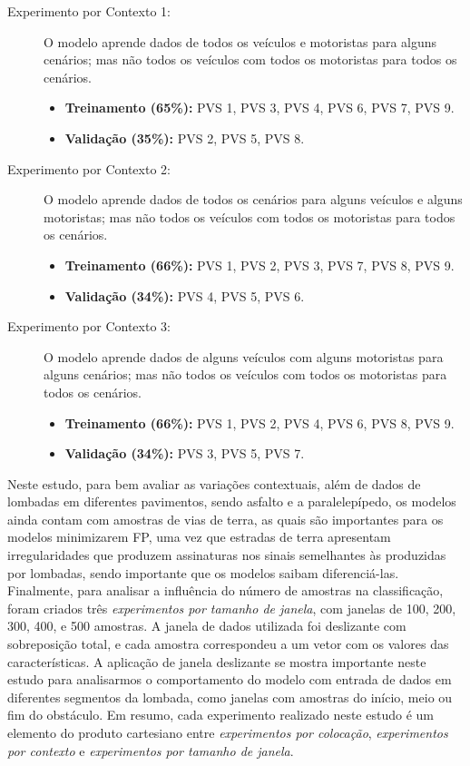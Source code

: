 \begin{description}
	
	\item[Experimento por Contexto 1:] O modelo aprende dados de todos os veículos e motoristas para alguns cenários; mas não todos os veículos com todos os motoristas para todos os cenários.
    \begin{itemize}
        \item \textbf{Treinamento (65\%):} PVS 1, PVS 3, PVS 4, PVS 6, PVS 7, PVS 9. 
        \item \textbf{Validação (35\%):} PVS 2, PVS 5, PVS 8.
    \end{itemize}
    
    \item[Experimento por Contexto 2:] O modelo aprende dados de todos os cenários para alguns veículos e alguns motoristas; mas não todos os veículos com todos os motoristas para todos os cenários.
    \begin{itemize}
        \item \textbf{Treinamento (66\%):} PVS 1, PVS 2, PVS 3, PVS 7, PVS 8, PVS 9.
        \item \textbf{Validação (34\%):} PVS 4, PVS 5, PVS 6.
    \end{itemize}
    
    \item[Experimento por Contexto 3:] O modelo aprende dados de alguns veículos com alguns motoristas para alguns cenários; mas não todos os veículos com todos os motoristas para todos os cenários.
    \begin{itemize}
        \item \textbf{Treinamento (66\%):} PVS 1, PVS 2, PVS 4, PVS 6, PVS 8, PVS 9.
        \item \textbf{Validação (34\%):} PVS 3, PVS 5, PVS 7.
    \end{itemize}
    
\end{description}

Neste estudo, para bem avaliar as variações contextuais, além de dados de lombadas em diferentes pavimentos, sendo asfalto e a paralelepípedo, os modelos ainda contam com amostras de vias de terra, as quais são importantes para os modelos minimizarem FP, uma vez que estradas de terra apresentam irregularidades que produzem assinaturas nos sinais semelhantes às produzidas por lombadas, sendo importante que os modelos saibam diferenciá-las. Finalmente, para analisar a influência do número de amostras na classificação, foram criados três \emph{experimentos por tamanho de janela}, com janelas de 100, 200, 300, 400, e 500 amostras. A janela de dados utilizada foi deslizante com sobreposição total, e cada amostra correspondeu a um vetor com os valores das características. A aplicação de janela deslizante se mostra importante neste estudo para analisarmos o comportamento do modelo com entrada de dados em diferentes segmentos da lombada, como janelas com amostras do início, meio ou fim do obstáculo. Em resumo, cada experimento realizado neste estudo é um elemento do produto cartesiano entre \emph{experimentos por colocação}, \emph{experimentos por contexto} e \emph{experimentos por tamanho de janela}.

